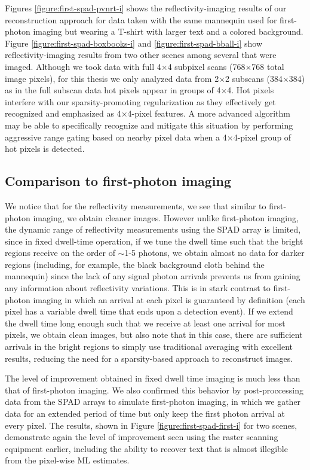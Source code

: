 Figures \ref{figure:first-spad-pvnrt-i} shows the reflectivity-imaging results of our reconstruction approach for data taken with the same mannequin used for first-photon imaging but wearing a T-shirt with larger text and a colored background. Figure \ref{figure:first-spad-boxbooks-i} and \ref{figure:first-spad-bball-i} show reflectivity-imaging results from two other scenes among several that were imaged. Although we took data with full 4$\times$4 subpixel scans (768$\times$768 total image pixels), for this thesis we only analyzed data from 2$\times$2 subscans (384$\times$384) as in the full subscan data hot pixels appear in groups of 4$\times$4. Hot pixels interfere with our sparsity-promoting regularization as they effectively get recognized and emphasized as 4$\times$4-pixel features. A more advanced algorithm may be able to specifically recognize and mitigate this situation by performing aggressive range gating based on nearby pixel data when a 4$\times$4-pixel group of hot pixels is detected.

\subsection{Comparison to first-photon imaging}

We notice that for the reflectivity measurements, we see that similar to first-photon imaging, we obtain cleaner images. However unlike first-photon imaging, the dynamic range of reflectivity measurements using the SPAD array is limited, since in fixed dwell-time operation, if we tune the dwell time such that the bright regions receive on the order of $\sim$1-5 photons, we obtain almost no data for darker regions (including, for example, the black background cloth behind the mannequin) since the lack of any signal photon arrivals prevents us from gaining any information about reflectivity variations. This is in stark contrast to first-photon imaging in which an arrival at each pixel is guaranteed by definition (each pixel has a variable dwell time that ends upon a detection event). If we extend the dwell time long enough such that we receive at least one arrival for most pixels, we obtain clean images, but also note that in this case, there are sufficient arrivals in the bright regions to simply use traditional averaging with excellent results, reducing the need for a sparsity-based approach to reconstruct images.

The level of improvement obtained in fixed dwell time imaging is much less than that of first-photon imaging. We also confirmed this behavior by post-proccessing data from the SPAD arrays to simulate first-photon imaging, in which we gather data for an extended period of time but only keep the first photon arrival at every pixel. The results, shown in Figure \ref{figure:first-spad-first-i} for two scenes, demonstrate again the level of improvement seen using the raster scanning equipment earlier, including the ability to recover text that is almost illegible from the pixel-wise ML estimates.

